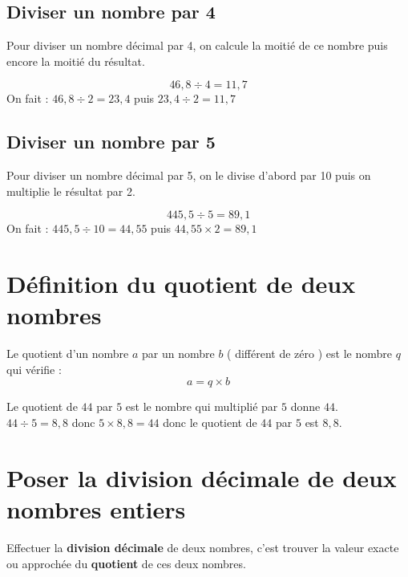 \documentclass[a4paper,dvipsnames]{article}
\begin{document}
\subsection{Diviser un nombre par 4}

\begin{Mt}
Pour diviser un nombre décimal par 4, on calcule la moitié de ce nombre puis encore la moitié du résultat.
\end{Mt}

\begin{Ex}
\[46,8\div4=11,7\]
On fait : $46,8\div2=23,4$ puis $23,4\div2=11,7$
\end{Ex}

\subsection{Diviser un nombre par 5}

\begin{Mt}
Pour diviser un nombre décimal par 5, on le divise d'abord par 10 puis on multiplie le résultat par 2.
\end{Mt}

\begin{Ex}
\[445,5\div5=89,1\]
On fait : $445,5\div10=44,55$ puis $44,55\times2=89,1$
\end{Ex}

\section{Définition du quotient de deux nombres}

\begin{Def}
Le quotient d'un nombre $a$ par un nombre $b$ ( différent de zéro ) est le nombre $q$ qui vérifie :
\[a=q\times b\]
\end{Def}

\begin{Ex}
Le quotient de $44$ par $5$ est le nombre qui multiplié par $5$ donne $44$.\\
$44\div5=8,8$ donc $5\times8,8=44$ donc le quotient de $44$ par $5$ est $8,8$.
\end{Ex}

\section{Poser la division décimale de deux nombres entiers}

\begin{Def}
Effectuer la \textbf{division décimale} de deux nombres, c'est trouver la valeur exacte ou approchée du \textbf{quotient} de ces deux nombres.
\end{Def}
\end{document}
